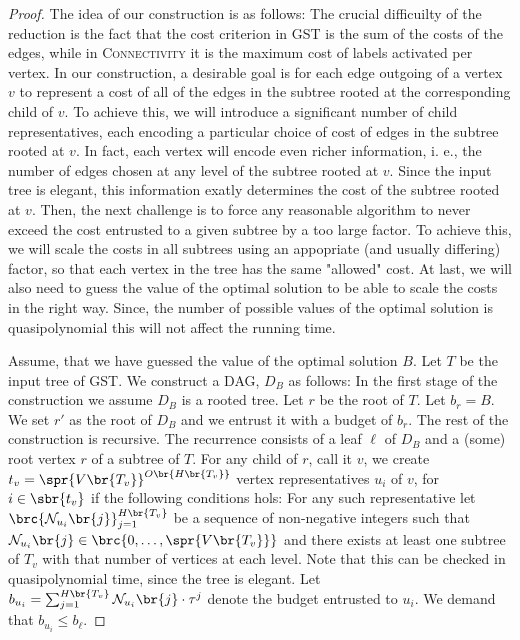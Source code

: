 \begin{proof}
    The idea of our construction is as follows: The crucial difficuilty of the reduction is the fact that the cost criterion in \textsc{GST} is the sum of the costs of the edges, while in \textsc{Connectivity} it is the maximum cost of labels activated per vertex. In our construction, a desirable goal is for each edge outgoing of a vertex $v$ to represent a cost of all of the edges in the subtree rooted at the corresponding child of $v$. To achieve this, we will introduce a significant number of child representatives, each encoding a particular choice of cost of edges in the subtree rooted at $v$. In fact, each vertex will encode even richer information, i. e., the number of edges chosen at any level of the subtree rooted at $v$. Since the input tree is elegant, this information exatly determines the cost of the subtree rooted at $v$. Then, the next challenge is to force any reasonable algorithm to never exceed the cost entrusted to a given subtree by a too large factor. To achieve this, we will scale the costs in all subtrees using an appopriate (and usually differing) factor, so that each vertex in the tree has the same "allowed" cost. At last, we will also need to guess the value of the optimal solution to be able to scale the costs in the right way. Since, the number of possible values of the optimal solution is quasipolynomial this will not affect the running time.

    Assume, that we have guessed the value of the optimal solution $B$. Let $T$ be the input tree of \textsc{GST}. We construct a DAG, $D_B$ as follows: In the first stage of the construction  we assume $D_B$ is a rooted tree. Let $r$ be the root of $T$. Let $b_r=B$. We set $r'$ as the root of $D_B$ and we entrust it with a budget of $b_r$. The rest of the construction is recursive. The recurrence consists of a leaf $\ell$ of $D_B$ and a (some) root vertex $r$ of a subtree of $T$. For any child of $r$, call it $v$, we create $t_v=\spr{V\br{T_v}}^{O\br{H\br{T_v}}}$ vertex representatives $u_i$ of $v$, for $i\in \sbr{t_v}$ if the following conditions hols: For any such representative let $\brc{\mathcal{N}_{u_i}\br{j}}_{j=1}^{H\br{T_v}}$ be a sequence of non-negative integers such that $\mathcal{N}_{u_i}\br{j}\in \brc{0,\ldots, \spr{V\br{T_{v}}}}$ and there exists at least one subtree of $T_v$ with that number of vertices at each level. Note that this can be checked in quasipolynomial time, since the tree is elegant. Let $b_{u_i}=\sum_{j=1}^{H\br{T_v}}\mathcal{N}_{u_i}\br{j}\cdot \tau^j$ denote the budget entrusted to $u_i$. We demand that $b_{u_i}\leq b_{\ell}$. 
    

\end{proof}
